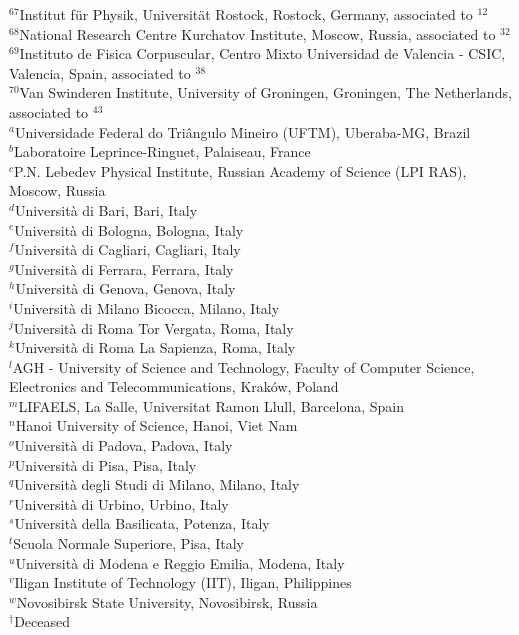 \begin{flushleft}
{$ ^{67}$Institut f{\"u}r Physik, Universit{\"a}t Rostock, Rostock, Germany, associated to $^{12}$\\
$ ^{68}$National Research Centre Kurchatov Institute, Moscow, Russia, associated to $^{32}$\\
$ ^{69}$Instituto de Fisica Corpuscular, Centro Mixto Universidad de Valencia - CSIC, Valencia, Spain, associated to $^{38}$\\
$ ^{70}$Van Swinderen Institute, University of Groningen, Groningen, The Netherlands, associated to $^{43}$\\
\bigskip
$ ^{a}$Universidade Federal do Tri{\^a}ngulo Mineiro (UFTM), Uberaba-MG, Brazil\\
$ ^{b}$Laboratoire Leprince-Ringuet, Palaiseau, France\\
$ ^{c}$P.N. Lebedev Physical Institute, Russian Academy of Science (LPI RAS), Moscow, Russia\\
$ ^{d}$Universit{\`a} di Bari, Bari, Italy\\
$ ^{e}$Universit{\`a} di Bologna, Bologna, Italy\\
$ ^{f}$Universit{\`a} di Cagliari, Cagliari, Italy\\
$ ^{g}$Universit{\`a} di Ferrara, Ferrara, Italy\\
$ ^{h}$Universit{\`a} di Genova, Genova, Italy\\
$ ^{i}$Universit{\`a} di Milano Bicocca, Milano, Italy\\
$ ^{j}$Universit{\`a} di Roma Tor Vergata, Roma, Italy\\
$ ^{k}$Universit{\`a} di Roma La Sapienza, Roma, Italy\\
$ ^{l}$AGH - University of Science and Technology, Faculty of Computer Science, Electronics and Telecommunications, Krak{\'o}w, Poland\\
$ ^{m}$LIFAELS, La Salle, Universitat Ramon Llull, Barcelona, Spain\\
$ ^{n}$Hanoi University of Science, Hanoi, Viet Nam\\
$ ^{o}$Universit{\`a} di Padova, Padova, Italy\\
$ ^{p}$Universit{\`a} di Pisa, Pisa, Italy\\
$ ^{q}$Universit{\`a} degli Studi di Milano, Milano, Italy\\
$ ^{r}$Universit{\`a} di Urbino, Urbino, Italy\\
$ ^{s}$Universit{\`a} della Basilicata, Potenza, Italy\\
$ ^{t}$Scuola Normale Superiore, Pisa, Italy\\
$ ^{u}$Universit{\`a} di Modena e Reggio Emilia, Modena, Italy\\
$ ^{v}$Iligan Institute of Technology (IIT), Iligan, Philippines\\
$ ^{w}$Novosibirsk State University, Novosibirsk, Russia\\
\medskip
$ ^{\dagger}$Deceased
}
\end{flushleft}